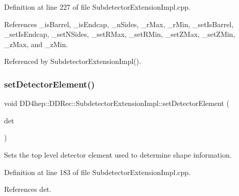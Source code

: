 Definition at line 227 of file Subdetector\+Extension\+Impl.\+cpp.



References \+\_\+is\+Barrel, \+\_\+is\+Endcap, \+\_\+n\+Sides, \+\_\+r\+Max, \+\_\+r\+Min, \+\_\+set\+Is\+Barrel, \+\_\+set\+Is\+Endcap, \+\_\+set\+N\+Sides, \+\_\+set\+R\+Max, \+\_\+set\+R\+Min, \+\_\+set\+Z\+Max, \+\_\+set\+Z\+Min, \+\_\+z\+Max, and \+\_\+z\+Min.



Referenced by Subdetector\+Extension\+Impl().

\hypertarget{class_d_d4hep_1_1_d_d_rec_1_1_subdetector_extension_impl_a6b2e5282d0f58128a056e95459d61939}{}\label{class_d_d4hep_1_1_d_d_rec_1_1_subdetector_extension_impl_a6b2e5282d0f58128a056e95459d61939} 
\subsubsection{\texorpdfstring{set\+Detector\+Element()}{setDetectorElement()}}
{\footnotesize\ttfamily void D\+D4hep\+::\+D\+D\+Rec\+::\+Subdetector\+Extension\+Impl\+::set\+Detector\+Element (\begin{DoxyParamCaption}\item[{const \hyperlink{class_d_d4hep_1_1_geometry_1_1_det_element}{Geometry\+::\+Det\+Element} \&}]{det }\end{DoxyParamCaption})}



Sets the top level detector element used to determine shape information. 



Definition at line 183 of file Subdetector\+Extension\+Impl.\+cpp.



References det.

\hypertarget{class_d_d4hep_1_1_d_d_rec_1_1_subdetector_extension_impl_ad63db1c5bca1c435c0f79514f47798d0}{}\label{class_d_d4hep_1_1_d_d_rec_1_1_subdetector_extension_impl_ad63db1c5bca1c435c0f79514f47798d0} 
